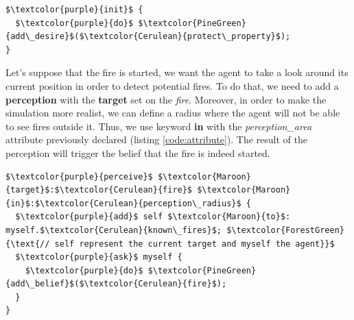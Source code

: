 \documentclass[12pt, a4paper]{memoir} %
\begin{document}
			\begin{lstlisting}[mathescape,caption=Initialisation of the agent.,label=code:bdi]
$\textcolor{purple}{init}$ {
  $\textcolor{purple}{do}$ $\textcolor{PineGreen}{add\_desire}$($\textcolor{Cerulean}{protect\_property}$);
}
			\end{lstlisting}

			Let's suppose that the fire is started, we want the agent to take a look around its current position in order to detect potential fires. To do that, we need to add a \textbf{perception} with the \textbf{target} set on the
			\textit{fire}. Moreover, in order to make the simulation more realist, we can define a radius where the agent will not be able to see fires outside it. Thus, we use keyword \textbf{in} with the \textit{perception\_area} attribute
			previously declared (listing \ref{code:attribute}). The result of the perception will trigger the belief that the fire is indeed started.

			\begin{lstlisting}[mathescape,caption=Perceptions declaration.,label=code:bdi]
$\textcolor{purple}{perceive}$ $\textcolor{Maroon}{target}$:$\textcolor{Cerulean}{fire}$ $\textcolor{Maroon}{in}$:$\textcolor{Cerulean}{perception\_radius}$ {
  $\textcolor{purple}{add}$ self $\textcolor{Maroon}{to}$: myself.$\textcolor{Cerulean}{known\_fires}$; $\textcolor{ForestGreen}{\text{// self represent the current target and myself the agent}}$
  $\textcolor{purple}{ask}$ myself {
    $\textcolor{purple}{do}$ $\textcolor{PineGreen}{add\_belief}$($\textcolor{Cerulean}{fire}$);
  }
}
			\end{lstlisting}
\end{document}
